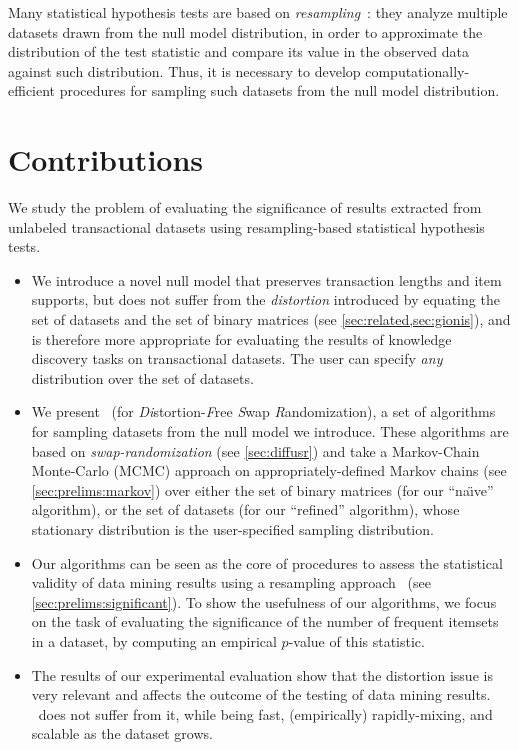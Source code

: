 Many statistical hypothesis tests are based on
\emph{resampling}~\citep{WestfallY93}: they analyze multiple datasets drawn
from the null model distribution, in order to approximate the distribution of
the test statistic and compare its value in the observed data against such
distribution. Thus, it is necessary to develop computationally-efficient
procedures for sampling such datasets from the null model distribution.

\section{Contributions}

We study the problem of evaluating the significance of results extracted from
unlabeled transactional datasets using resampling-based statistical hypothesis
tests.

\begin{itemize}
  \item We introduce a novel null model that preserves transaction lengths and
    item supports, but does not suffer from  the \emph{distortion} introduced by
    equating the set of datasets and the set of binary matrices (see
    \cref{sec:related,sec:gionis}), and is therefore more appropriate for
    evaluating the results of knowledge discovery tasks on transactional
    datasets. The user can specify \emph{any} distribution over the set of
    datasets.
  \item We present \algo\ (for \emph{Di}stortion-\emph{F}ree
    \emph{S}wap \emph{R}andomization), a set of algorithms for sampling datasets
    from the null model we introduce. These algorithms are based on
    \emph{swap-randomization} (see \cref{sec:diffusr}) and take a
    Markov-Chain Monte-Carlo (MCMC) approach on appropriately-defined Markov
    chains (see \cref{sec:prelims:markov}) over either the set of binary
    matrices (for our ``na\"{\i}ve'' algorithm), or the set of datasets (for our
    ``refined'' algorithm), whose stationary distribution is the user-specified
    sampling distribution.
  \item Our algorithms can be seen as the core of procedures to assess the
    statistical validity of data mining results using a resampling
    approach~\citep{WestfallY93} (see \cref{sec:prelims:significant}). To show
    the usefulness of our algorithms, we focus on the task of evaluating the
    significance of the number of frequent itemsets in a dataset, by
    computing an empirical $p$-value of this statistic.
  \item The results of our experimental evaluation show that the distortion
      issue is very relevant and affects the outcome of the testing of data mining
      results. \algo\ does not suffer from it, while being fast, (empirically)
      rapidly-mixing, and scalable as the dataset grows.
\end{itemize}

